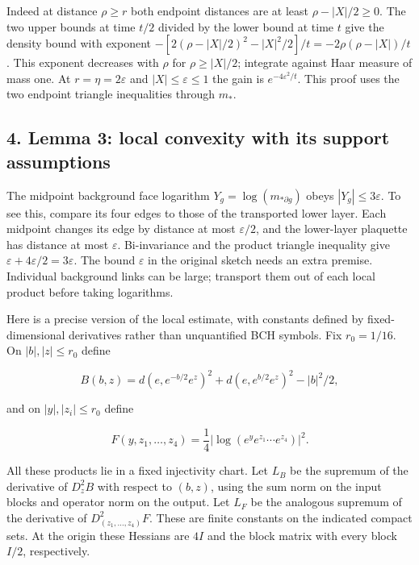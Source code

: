 \documentclass[11pt,a4paper]{article}
\begin{document}
Indeed at distance \(\rho\ge r\) both endpoint distances are at least
\(\rho-|X|/2\ge0\). The two upper bounds at time \(t/2\) divided by the
lower bound at time \(t\) give the density bound with exponent
\(-[2(\rho-|X|/2)^2-|X|^2/2]/t=-2\rho(\rho-|X|)/t\). This exponent
decreases with \(\rho\) for \(\rho\ge|X|/2\); integrate against Haar
measure of mass one. At \(r=\eta=2\varepsilon\) and
\(|X|\le\varepsilon\le1\) the gain is \(e^{-4\varepsilon^2/t}\). This
proof uses the two endpoint triangle inequalities through \(m_*\).

\hypertarget{lemma-3-local-convexity-with-its-support-assumptions}{%
\subsection{4. Lemma 3: local convexity with its support
assumptions}\label{lemma-3-local-convexity-with-its-support-assumptions}}

The midpoint background face logarithm \(Y_g=\log(m_{*\partial g})\)
obeys \(|Y_g|\le3\varepsilon\). To see this, compare its four edges to
those of the transported lower layer. Each midpoint changes its edge by
distance at most \(\varepsilon/2\), and the lower-layer plaquette has
distance at most \(\varepsilon\). Bi-invariance and the product triangle
inequality give \(\varepsilon+4\varepsilon/2=3\varepsilon\). The bound
\(\varepsilon\) in the original sketch needs an extra premise.
Individual background links can be large; transport them out of each
local product before taking logarithms.

Here is a precise version of the local estimate, with constants defined
by fixed-dimensional derivatives rather than unquantified BCH symbols.
Fix \(r_0=1/16\). On \(|b|,|z|\le r_0\) define

\[B(b,z)=d(e,e^{-b/2}e^z)^2+d(e,e^{b/2}e^z)^2-|b|^2/2,\]

and on \(|y|,|z_i|\le r_0\) define

\[F(y,z_1,\ldots,z_4)=\frac14
\left|\log(e^ye^{z_1}\cdots e^{z_4})\right|^2.\]

All these products lie in a fixed injectivity chart. Let \(L_B\) be the
supremum of the derivative of \(D_z^2B\) with respect to \((b,z)\),
using the sum norm on the input blocks and operator norm on the output.
Let \(L_F\) be the analogous supremum of the derivative of
\(D_{(z_1,\ldots,z_4)}^2F\). These are finite constants on the indicated
compact sets. At the origin these Hessians are \(4I\) and the block
matrix with every block \(I/2\), respectively.
\end{document}
